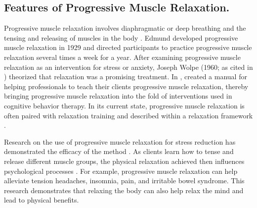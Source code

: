 \subsection*{Features of Progressive Muscle Relaxation.}

Progressive muscle relaxation involves diaphragmatic or deep breathing and the tensing and releasing of muscles in the body \citep{jacobson1938relaxation}. Edmund \citeauthor{jacobson1938relaxation} developed progressive muscle relaxation in 1929 \citep[as cited in][]{peterson2011relaxation} and directed participants to practice progressive muscle relaxation several times a week for a year. After examining progressive muscle relaxation as an intervention for stress or anxiety, Joseph Wolpe (1960; as cited in \cite{peterson2011relaxation}) theorized that relaxation was a promising treatment. In \citeyear{bernstein1973progressive}, \citeauthor{bernstein1973progressive} created a manual for helping professionals to teach their clients progressive muscle relaxation, thereby bringing progressive muscle relaxation into the fold of interventions used in cognitive behavior therapy. In its current state, progressive muscle relaxation is often paired with relaxation training and described within a relaxation framework \citep[see][for more]{freebird2012progressive}.

Research on the use of progressive muscle relaxation for stress reduction has demonstrated the efficacy of the method \citep{mcguigan2007relaxation}. As clients learn how to tense and release different muscle groups, the physical relaxation achieved then influences psychological processes \citep{mccallie2006progressive}. For example, progressive muscle relaxation can help alleviate tension headaches, insomnia, pain, and irritable bowel syndrome. This research demonstrates that relaxing the body can also help relax the mind and lead to physical benefits.
